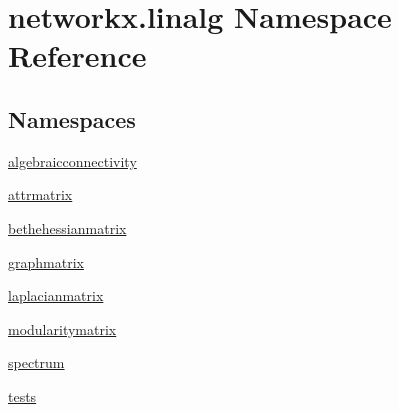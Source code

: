 \hypertarget{namespacenetworkx_1_1linalg}{}\section{networkx.\+linalg Namespace Reference}
\label{namespacenetworkx_1_1linalg}
\subsection*{Namespaces}
\begin{DoxyCompactItemize}
\item 
 \hyperlink{namespacenetworkx_1_1linalg_1_1algebraicconnectivity}{algebraicconnectivity}
\item 
 \hyperlink{namespacenetworkx_1_1linalg_1_1attrmatrix}{attrmatrix}
\item 
 \hyperlink{namespacenetworkx_1_1linalg_1_1bethehessianmatrix}{bethehessianmatrix}
\item 
 \hyperlink{namespacenetworkx_1_1linalg_1_1graphmatrix}{graphmatrix}
\item 
 \hyperlink{namespacenetworkx_1_1linalg_1_1laplacianmatrix}{laplacianmatrix}
\item 
 \hyperlink{namespacenetworkx_1_1linalg_1_1modularitymatrix}{modularitymatrix}
\item 
 \hyperlink{namespacenetworkx_1_1linalg_1_1spectrum}{spectrum}
\item 
 \hyperlink{namespacenetworkx_1_1linalg_1_1tests}{tests}
\end{DoxyCompactItemize}
